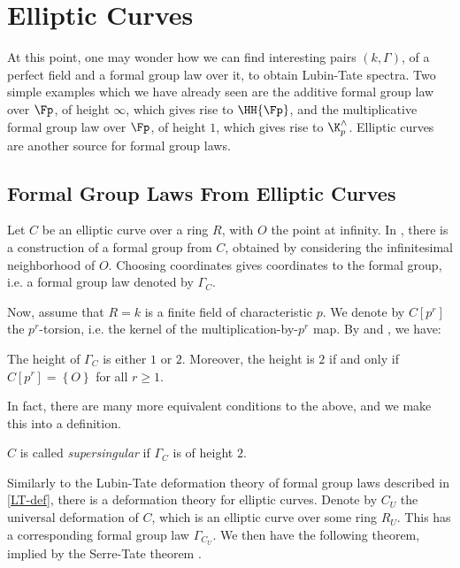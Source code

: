 \section{Elliptic Curves}

At this point, one may wonder how we can find interesting pairs $\left(k, \Gamma\right)$, of a perfect field and a formal group law over it, to obtain Lubin-Tate spectra.
Two simple examples which we have already seen are the additive formal group law over $\Fp$, of height $\infty$, which gives rise to $\HH{\Fp}$, and the multiplicative formal group law over $\Fp$, of height $1$, which gives rise to $\K_p^\wedge$.
Elliptic curves are another source for formal group laws.



\subsection{Formal Group Laws From Elliptic Curves}

Let $C$ be an elliptic curve over a ring $R$, with $O$ the point at infinity.
In \cite[IV]{Sil}, there is a construction of a formal group from $C$, obtained by considering the infinitesimal neighborhood of $O$.
Choosing coordinates gives coordinates to the formal group, i.e. a formal group law denoted by $\Gamma_C$.

Now, assume that $R = k$ is a finite field of characteristic $p$.
We denote by $C\left[p^r\right]$ the $p^r$-torsion, i.e. the kernel of the multiplication-by-$p^r$ map.
By \cite[IV.7.5]{Sil} and \cite[V.3.1]{Sil}, we have:

\begin{proposition}
	The height of $\Gamma_C$ is either $1$ or $2$.
	Moreover, the height is $2$ if and only if $C\left[p^r\right] = \left\{ O \right\}$ for all $r \geq 1$.
\end{proposition}

In fact, there are many more equivalent conditions to the above, and we make this into a definition.

\begin{definition}
	$C$ is called \emph{supersingular} if $\Gamma_C$ is of height $2$.
\end{definition}

Similarly to the Lubin-Tate deformation theory of formal group laws described in \ref{LT-def}, there is a deformation theory for elliptic curves.
Denote by $C_U$ the universal deformation of $C$, which is an elliptic curve over some ring $R_U$.
This has a corresponding formal group law $\Gamma_{C_U}$.
We then have the following theorem, implied by the Serre-Tate theorem \cite[1.2.1]{ST}.

